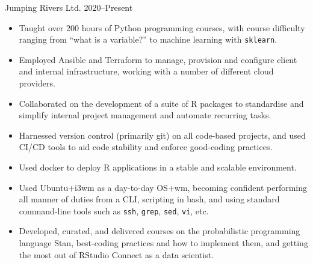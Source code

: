 \documentclass[12pt, a4paper]{article}
\begin{document}

\makecard





%
        {Jumping Rivers Ltd.}%
        {2020--Present}

\vspace{-0.15em}
\begin{itemize}[
    itemsep=.05em,
    labelwidth=2em,
    leftmargin=2em,
    topsep=0em]

    \item[] 
                   {Taught over 200 hours of Python programming courses, with
                   course difficulty ranging from ``what is a variable?'' to
                   machine learning with \texttt{sklearn}.}%

    \item[] 
                   {Employed Ansible and Terraform to manage, provision and
                   configure client and internal infrastructure, working with a
                   number of different cloud providers.}%

    \item[] 
                   {Collaborated on the development of a suite of R packages to
                    standardise and simplify internal project management and
                    automate recurring tasks.}

    \item[] 
                   {Harnessed version control (primarily git) on all
                   code-based projects, and used CI/CD tools to aid code
                   stability and enforce good-coding practices.}%

    \item[] 
                   {Used docker to deploy R applications in a stable and
                   scalable environment.}%

    \item[] 
                   {Used Ubuntu+i3wm as a day-to-day OS+wm, becoming confident
                   performing all manner of duties from a CLI, scripting in
                   bash, and using standard command-line tools such as
                   \texttt{ssh}, \texttt{grep}, \texttt{sed}, \texttt{vi}, etc.}%

    \item[] 
                   {Developed, curated, and delivered courses on the
                   probabilistic programming language Stan, best-coding
                   practices and how to implement them, and getting the most
                   out of RStudio Connect as a data scientist.}%

\end{itemize}
\end{document}
